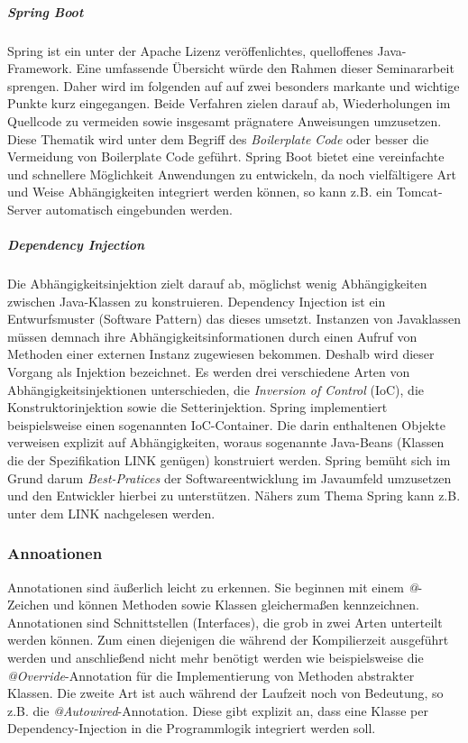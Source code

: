 \subparagraph{Spring Boot}
Spring ist ein unter der Apache Lizenz veröffenlichtes, quelloffenes Java-Framework. Eine umfassende Übersicht würde den Rahmen dieser Seminararbeit sprengen. Daher wird im folgenden auf auf zwei besonders markante und wichtige Punkte kurz eingegangen. Beide Verfahren zielen darauf ab, Wiederholungen im Quellcode zu vermeiden sowie insgesamt prägnatere Anweisungen umzusetzen. Diese Thematik wird unter dem Begriff des \emph{Boilerplate Code} oder besser die Vermeidung von Boilerplate Code geführt. Spring Boot bietet eine vereinfachte und schnellere Möglichkeit Anwendungen zu entwickeln, da noch vielfältigere Art und Weise Abhängigkeiten integriert werden können, so kann z.B. ein Tomcat-Server automatisch eingebunden werden.  

\subparagraph{Dependency Injection}
Die Abhängigkeitsinjektion zielt darauf ab, möglichst wenig Abhängigkeiten zwischen Java-Klassen zu konstruieren. Dependency Injection ist ein Entwurfsmuster (Software Pattern) das dieses umsetzt. Instanzen von Javaklassen müssen demnach ihre Abhängigkeitsinformationen durch einen Aufruf von Methoden einer externen Instanz zugewiesen bekommen. Deshalb wird dieser Vorgang als Injektion bezeichnet. Es werden drei verschiedene Arten von Abhängigkeitsinjektionen unterschieden, die \emph{Inversion of Control} (IoC), die Konstruktorinjektion sowie die Setterinjektion. Spring implementiert beispielsweise einen sogenannten IoC-Container. Die darin enthaltenen Objekte verweisen explizit auf Abhängigkeiten, woraus sogenannte Java-Beans (Klassen die der Spezifikation LINK genügen) konstruiert werden. Spring bemüht sich im Grund darum  \emph{Best-Pratices} der Softwareentwicklung im Javaumfeld umzusetzen und den Entwickler hierbei zu unterstützen. Nähers zum Thema Spring kann z.B. unter dem LINK nachgelesen werden.


\subsubsection{Annoationen}
Annotationen sind äußerlich leicht zu erkennen. Sie beginnen mit einem \emph{@}-Zeichen und können Methoden sowie Klassen gleichermaßen kennzeichnen. Annotationen sind Schnittstellen (Interfaces), die grob in zwei Arten unterteilt werden können. Zum einen diejenigen die während der Kompilierzeit ausgeführt werden und anschließend nicht mehr benötigt werden wie beispielsweise die \emph{@Override}-Annotation für die Implementierung von Methoden abstrakter Klassen. Die zweite Art ist auch während der Laufzeit noch von Bedeutung, so z.B. die \emph{@Autowired}-Annotation. Diese gibt explizit an, dass eine Klasse per Dependency-Injection in die Programmlogik integriert werden soll. 

